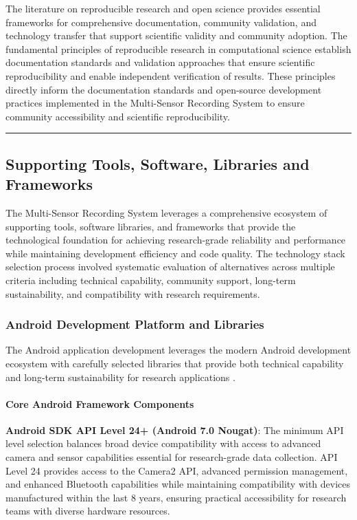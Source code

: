 \documentclass[12pt,a4paper]{article}
\begin{document}
The literature on reproducible research and open science provides essential frameworks for comprehensive documentation,
community validation, and technology transfer that support scientific validity and community adoption. The fundamental
principles of reproducible research in computational science establish documentation standards and validation approaches
that ensure scientific reproducibility and enable independent verification of results. These principles directly inform
the documentation standards and open-source development practices implemented in the Multi-Sensor Recording System to
ensure community accessibility and scientific reproducibility.

\hrule

\subsection{Supporting Tools, Software, Libraries and Frameworks}

The Multi-Sensor Recording System leverages a comprehensive ecosystem of supporting tools, software libraries, and
frameworks that provide the technological foundation for achieving research-grade reliability and performance while
maintaining development efficiency and code quality. The technology stack selection process involved systematic
evaluation of alternatives across multiple criteria including technical capability, community support, long-term
sustainability, and compatibility with research requirements.

\subsubsection{Android Development Platform and Libraries}

The Android application development leverages the modern Android development ecosystem with carefully selected libraries
that provide both technical capability and long-term sustainability for research applications .

\paragraph{Core Android Framework Components}

\textbf{Android SDK API Level 24+ (Android 7.0 Nougat)}: The minimum API level selection balances broad device compatibility
with access to advanced camera and sensor capabilities essential for research-grade data collection. API Level 24
provides access to the Camera2 API, advanced permission management, and enhanced Bluetooth capabilities while
maintaining compatibility with devices manufactured within the last 8 years, ensuring practical accessibility for
research teams with diverse hardware resources.
\end{document}
